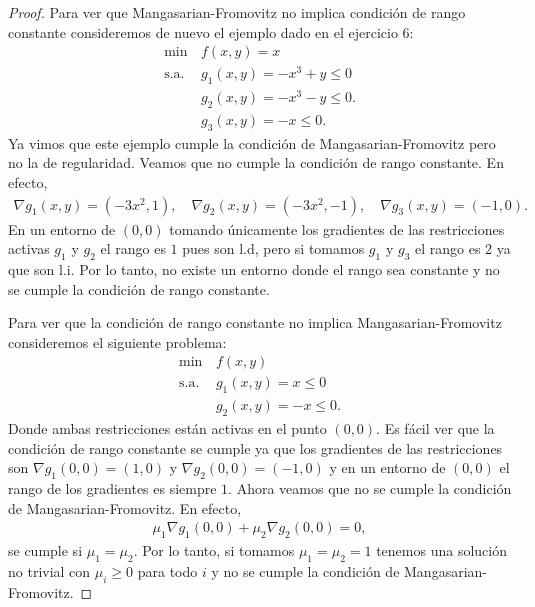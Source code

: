 \documentclass{article}
\begin{document}
\begin{proof}
    Para ver que Mangasarian-Fromovitz no implica condición de rango constante consideremos de nuevo el ejemplo dado en el ejercicio 6: \begin{align*}
        \min \,      & f(x, y) = x                  \\
        \text{s.a. } & g_1(x, y) = -x^3 + y \leq 0  \\
                     & g_2(x, y) = -x^3 - y \leq 0. \\
                     & g_3(x, y) = -x \leq 0.
    \end{align*}
    Ya vimos que este ejemplo cumple la condición de Mangasarian-Fromovitz pero no la de regularidad. Veamos que no cumple la condición de rango constante.
    En efecto, \begin{align*}
        \nabla g_1(x, y) = (-3x^2, 1), \quad \nabla g_2(x, y) = (-3x^2, -1), \quad \nabla g_3(x, y) = (-1, 0).
    \end{align*}
    En un entorno de \( (0, 0) \) tomando únicamente los gradientes de las restricciones activas \( g_1 \) y \( g_2 \) el rango es \( 1 \) pues son l.d, pero si tomamos \( g_1 \) y \( g_3 \) el rango es \( 2 \) ya que son l.i. Por lo tanto, no existe un entorno donde el rango sea constante y no se cumple la condición de rango constante.

    Para ver que la condición de rango constante no implica Mangasarian-Fromovitz consideremos el siguiente problema: \begin{align*}
        \min \,      & f(x, y)                 \\
        \text{s.a. } & g_1(x, y) = x \leq 0    \\
                     & g_2(x, y) = - x \leq 0.
    \end{align*}
    Donde ambas restricciones están activas en el punto \( (0, 0) \). Es fácil ver que la condición de rango constante se cumple ya que los gradientes de las restricciones son \( \nabla g_1(0, 0) = (1, 0) \) y \( \nabla g_2(0, 0) = (-1, 0) \)
    y en un entorno de \( (0, 0) \) el rango de los gradientes es siempre \( 1 \). Ahora veamos que no se cumple la condición de Mangasarian-Fromovitz. En efecto, \begin{align*}
        \mu_1 \nabla g_1(0, 0) + \mu_2 \nabla g_2(0, 0) = 0,
    \end{align*}
    se cumple si \( \mu_1 = \mu_2 \). Por lo tanto, si tomamos \( \mu_1 = \mu_2 = 1 \) tenemos una solución no trivial con \( \mu_i \geq 0 \) para todo \( i \) y no se cumple la condición de Mangasarian-Fromovitz.
\end{proof}
\end{document}
